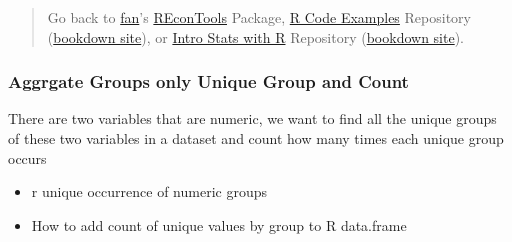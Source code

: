 \documentclass[
]{book}
\providecommand{\tightlist}{%
  \setlength{\itemsep}{0pt}\setlength{\parskip}{0pt}}
\begin{document}
\begin{quote}
Go back to \href{http://fanwangecon.github.io/}{fan}'s \href{https://fanwangecon.github.io/REconTools/}{REconTools} Package, \href{https://fanwangecon.github.io/R4Econ/}{R Code Examples} Repository (\href{https://fanwangecon.github.io/R4Econ/bookdown}{bookdown site}), or \href{https://fanwangecon.github.io/Stat4Econ/}{Intro Stats with R} Repository (\href{https://fanwangecon.github.io/Stat4Econ/bookdown}{bookdown site}).
\end{quote}

\hypertarget{aggrgate-groups-only-unique-group-and-count}{%
\subsubsection{Aggrgate Groups only Unique Group and Count}\label{aggrgate-groups-only-unique-group-and-count}}

There are two variables that are numeric, we want to find all the unique groups of these two variables in a dataset and count how many times each unique group occurs

\begin{itemize}
\tightlist
\item
  r unique occurrence of numeric groups
\item
  How to add count of unique values by group to R data.frame
\end{itemize}
\end{document}
